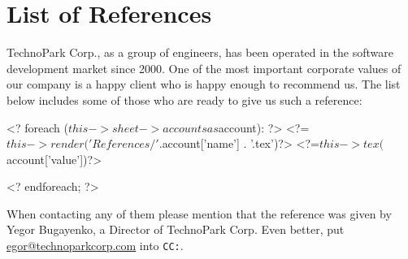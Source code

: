 
\section*{List of References}

TechnoPark Corp., as a group of engineers, has been operated 
in the software development market since 2000. One of
the most important corporate values of our company is 
a happy client who is happy enough to recommend us. 
The list below includes some of those who are ready to give us 
such a reference:

<? foreach ($this->sheet->accounts as $account): ?>
    <?=$this->render('References/' . $account['name'] . '.tex')?>{}
    <?=$this->tex($account['value'])?>{}
        
<? endforeach; ?>

When contacting any of them please mention
that the reference was given by Yegor Bugayenko,
a Director of TechnoPark Corp.  Even better, put
\href{mailto:egor@technoparkcorp.com}{egor@technoparkcorp.com} into \texttt{CC:}.
